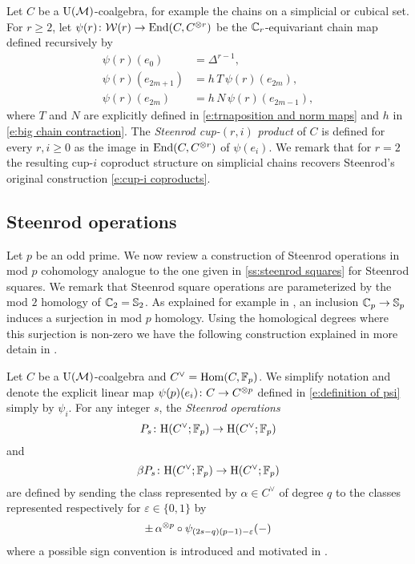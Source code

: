 Let $C$ be a $\operatorname{\mathrm{U}(\mathcal{M})}$-coalgebra, for example the chains on a simplicial or cubical set.
For $r \geq 2$, let $\psi(r) \colon \mathcal{W}(r) \to \mathrm{End}(C, C^{\otimes r})$ be the $\mathbb{C}_r$-equivariant chain map defined recursively by
\begin{equation}\label{e:definition of psi}
\begin{split}
\psi(r)(e_0) & = \Delta^{r-1}, \\
\psi(r)(e_{2m+1}) & = h\,T\,\psi(r)(e_{2m}), \\
\psi(r)(e_{2m}) & = h\,N\,\psi(r)(e_{2m-1}),
\end{split}
\end{equation}
where $T$ and $N$ are explicitly defined in \eqref{e:trnaposition and norm maps} and $h$ in \eqref{e:big chain contraction}.
The \textit{Steenrod cup-}$(r, i)$ \textit{product} of $C$ is defined for every $r, i \geq 0$ as the image in $\mathrm{End}(C, C^{\otimes r})$ of $\psi(e_i)$.
We remark that for $r = 2$ the resulting cup-$i$ coproduct structure on simplicial chains recovers Steenrod's original construction \eqref{e:cup-i coproducts}.

\subsection{Steenrod operations} \label{ss:steenrod operations}

Let $p$ be an odd prime.
We now review a construction of Steenrod operations in mod $p$ cohomology analogue to the one given in \cref{ss:steenrod squares} for Steenrod squares.
We remark that Steenrod square operations are parameterized by the mod $2$ homology of $\mathbb{C}_2 = \mathbb{S}_2$.
As explained for example in \cite[Corollary~VI.1.4]{adem2004milgram}, an inclusion $\mathbb{C}_p \to \mathbb{S}_p$ induces a surjection in mod $p$ homology.
Using the homological degrees where this surjection is non-zero we have the following construction explained in more detain in \cite{steenrod1952reduced, steenrod1953cyclic, steenrod1962cohomology, may1970general}.

Let $C$ be a $\operatorname{\mathrm{U}(\mathcal{M})}$-coalgebra and $C^\vee = \mathrm{Hom}(C, {\mathbb{F}_p})$.
We simplify notation and denote the explicit linear map $\psi(p)(e_i) \colon C \to C^{\otimes p}$ defined in \eqref{e:definition of psi} simply by $\psi_i$.
For any integer $s$, the \textit{Steenrod operations}
\begin{equation*}
P_s \colon \mathrm{H}(C^\vee; {\mathbb{F}_p}) \to \mathrm{H}(C^\vee; {\mathbb{F}_p})
\end{equation*}
and
\begin{equation*}
\beta P_s \colon \mathrm{H}(C^\vee; {\mathbb{F}_p}) \to \mathrm{H}(C^\vee; {\mathbb{F}_p})
\end{equation*}
are defined by sending the class represented by $\alpha \in C^\vee$ of degree $q$ to the classes represented respectively for $\varepsilon \in \{0,1\}$ by
\begin{equation*}
\pm \, \alpha^{\otimes p} \circ \psi_{(2s-q)(p-1)-\varepsilon}(-)
\end{equation*}
where a possible sign convention is introduced and motivated in \cite[(6.1)]{steenrod1953cyclic}.

